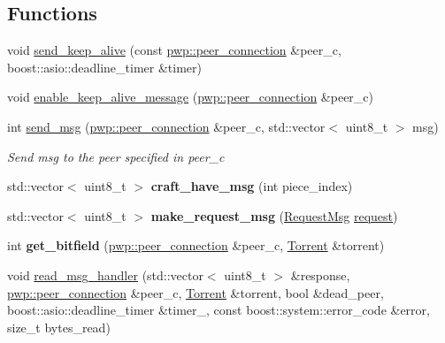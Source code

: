 \subsection*{Functions}
\begin{DoxyCompactItemize}
\item 
void \hyperlink{namespacepwp__msg_a9a577f5a53b823d83bb4694f1ebf141e}{send\+\_\+keep\+\_\+alive} (const \hyperlink{structpwp_1_1peer__connection}{pwp\+::peer\+\_\+connection} \&peer\+\_\+c, boost\+::asio\+::deadline\+\_\+timer \&timer)
\item 
void \hyperlink{namespacepwp__msg_a30c14bc06a8bb851ca79781cb9686b4f}{enable\+\_\+keep\+\_\+alive\+\_\+message} (\hyperlink{structpwp_1_1peer__connection}{pwp\+::peer\+\_\+connection} \&peer\+\_\+c)
\item 
int \hyperlink{namespacepwp__msg_aca807c6281879abef952f8feecccb6e8}{send\+\_\+msg} (\hyperlink{structpwp_1_1peer__connection}{pwp\+::peer\+\_\+connection} \&peer\+\_\+c, std\+::vector$<$ uint8\+\_\+t $>$ msg)
\begin{DoxyCompactList}\small\item\em Send {\ttfamily msg} to the peer specified in {\ttfamily peer\+\_\+c} \end{DoxyCompactList}\item 
\mbox{\label{namespacepwp__msg_a529a3db7938ccfaab85579d58e24061e}} 
std\+::vector$<$ uint8\+\_\+t $>$ {\bfseries craft\+\_\+have\+\_\+msg} (int piece\+\_\+index)
\item 
\mbox{\label{namespacepwp__msg_a2dcbe5fbe0eeca8910340f4978ee4235}} 
std\+::vector$<$ uint8\+\_\+t $>$ {\bfseries make\+\_\+request\+\_\+msg} (\hyperlink{structfileio_1_1RequestMsg}{Request\+Msg} \hyperlink{namespacepwp__msg_a0b9a29508f00a30e5138d2b78f4b1dafa4d6478c4fe948a9f3aa3ce8d09974370}{request})
\item 
\mbox{\label{namespacepwp__msg_aa9cc2ccac70638ed59075f27f938b8ec}} 
int {\bfseries get\+\_\+bitfield} (\hyperlink{structpwp_1_1peer__connection}{pwp\+::peer\+\_\+connection} \&peer\+\_\+c, \hyperlink{structtorr_1_1Torrent}{Torrent} \&torrent)
\item 
void \hyperlink{namespacepwp__msg_aec35de04a2f2d9cb6abdd777917cfaae}{read\+\_\+msg\+\_\+handler} (std\+::vector$<$ uint8\+\_\+t $>$ \&response, \hyperlink{structpwp_1_1peer__connection}{pwp\+::peer\+\_\+connection} \&peer\+\_\+c, \hyperlink{structtorr_1_1Torrent}{Torrent} \&torrent, bool \&dead\+\_\+peer, boost\+::asio\+::deadline\+\_\+timer \&timer\+\_\+, const boost\+::system\+::error\+\_\+code \&error, size\+\_\+t bytes\+\_\+read)

\end{DoxyCompactItemize}
